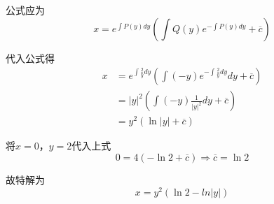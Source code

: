 \documentclass[oneside]{book} %
\begin{document}
公式应为
$$x = e^{\int P(y) dy}\left(\int Q(y) e^{-\int P(y) dy} + \overline{c}\right) $$

代入公式得
\begin{align*}
    x & = e^{\int \frac{2}{y}dy}\left(\int (-y)e^{-\int \frac{2}{y}dy} dy+ \overline{c}\right) \\
    & = \left\lvert y\right\rvert ^{2}\left(\int (-y)\frac{1}{\left\lvert y\right\rvert^{2} }dy + \overline{c}\right) \\
    & = y^{2}(\ln\left\lvert y\right\rvert + \overline{c})
\end{align*}

将$x = 0$，$y = 2$代入上式
$$0 = 4(-\ln 2 + \overline{c}) \Rightarrow \overline{c} = \ln 2$$

故特解为
$$x = y^{2}(\ln 2 - ln\left\lvert y\right\rvert )$$
\end{document}
